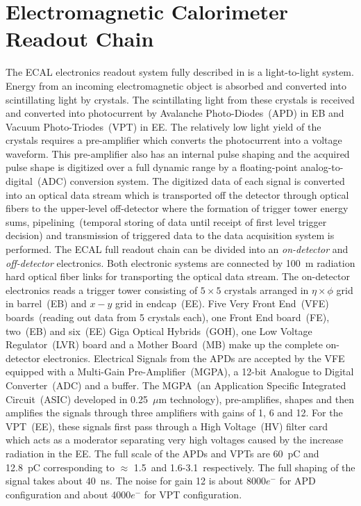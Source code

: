 \section{Electromagnetic Calorimeter Readout Chain}
The ECAL electronics readout system fully described in \cite{ECALREADOUT} is a light-to-light system. Energy from an incoming electromagnetic object is absorbed and converted into scintillating light by \pb crystals. The scintillating light from these crystals is received and converted into photocurrent by Avalanche Photo-Diodes~(APD) in EB and Vacuum Photo-Triodes~(VPT) in EE. The relatively low light yield of the crystals requires a pre-amplifier which converts the photocurrent into a voltage waveform. 
This pre-amplifier also has an internal pulse shaping and the acquired pulse shape is digitized over a full dynamic range by 
a floating-point analog-to-digital~(ADC) conversion system.  
The digitized data of each signal is converted into an optical data stream which is transported off the detector through optical fibers to the upper-level off-detector where the formation of trigger tower energy sums, pipelining~(temporal storing of data until receipt of first level trigger decision) and transmission of triggered data to the data acquisition system is performed. The ECAL full readout chain can be divided into an \textit{on-detector} and \textit{off-detector} electronics. Both electronic systems are connected by 100~m radiation hard optical fiber links for transporting the optical data stream. 
\newline
The on-detector electronics reads a trigger tower consisting of $5\times5$ crystals arranged in $\eta \times \phi$ grid in barrel~(EB) and $x-y$ grid in endcap~(EE).  Five Very Front End~(VFE) boards~(reading out data from 5 crystals each), one Front End board~(FE), two~(EB) and six~(EE) Giga Optical Hybrids~(GOH), one Low Voltage Regulator~(LVR) board and a Mother Board~(MB) make up the complete on-detector electronics. Electrical Signals from the APDs are accepted by the VFE equipped with a Multi-Gain Pre-Amplifier~(MGPA), a 12-bit Analogue to Digital Converter~(ADC) and a buffer. The MGPA~(an Application Specific Integrated Circuit~(ASIC) developed in 0.25~$\mu$m technology), pre-amplifies, shapes and then amplifies the signals through three amplifiers with gains of 1, 6 and 12. For the VPT~(EE), these signals first pass through a High Voltage~(HV) filter card which acts as a moderator separating very high voltages caused by the increase radiation in the EE. The full scale of the APDs and VPTs are 60~pC and 12.8~pC corresponding to $\approx$ 1.5~\TeV and 1.6-3.1~\TeV respectively. The full shaping of the signal takes about 40~ns. The noise for gain 12 is about 8000$e^{-}$ for APD configuration and about 4000$e^{-}$ for VPT configuration. 
